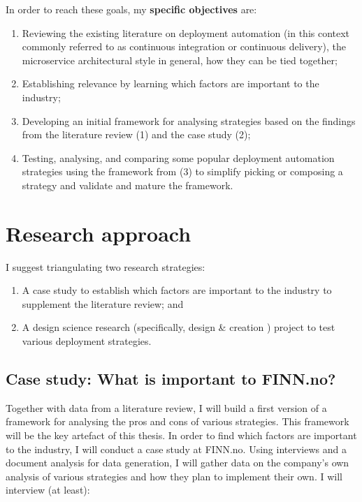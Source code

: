 In order to reach these goals, my \textbf{specific objectives} are:

\begin{enumerate}
  \item Reviewing the existing literature on deployment automation (in this context commonly referred to as continuous integration or continuous delivery), the microservice architectural style in general, how they can be tied together;
  \item Establishing relevance by learning which factors are important to the industry;
  \item Developing an initial framework for analysing strategies based on the findings from the literature review (1) and the case study (2);
  \item Testing, analysing, and comparing some popular deployment automation strategies using the framework from (3) to simplify picking or composing a strategy and validate and mature the framework.
\end{enumerate}

\section{Research approach}

I suggest triangulating two research strategies:

\begin{enumerate}
  \item A case study to establish which factors are important to the industry to supplement the literature review; and
  \item A design science research \autocite{vaishnavi:2015} (specifically, design \& creation \autocite{oates:2006}) project to test various deployment strategies.
\end{enumerate}

\subsection{Case study: What is important to FINN.no?}

Together with data from a literature review, I will build a first version of a framework for analysing the pros and cons of various strategies. This framework will be the key artefact of this thesis. In order to find which factors are important to the industry, I will conduct a case study at FINN.no. Using interviews and a document analysis for data generation, I will gather data on the company's own analysis of various strategies and how they plan to implement their own. I will interview (at least):

